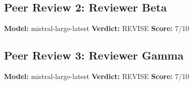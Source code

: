 \documentclass{article}
\begin{document}
\begin{quote}

\end{quote}

\subsection{Peer Review 2: Reviewer Beta}
\textbf{Model:} mistral-large-latest \quad \textbf{Verdict:} REVISE \quad \textbf{Score:} 7/10

\begin{quote}

\end{quote}

\subsection{Peer Review 3: Reviewer Gamma}
\textbf{Model:} mistral-large-latest \quad \textbf{Verdict:} REVISE \quad \textbf{Score:} 7/10

\begin{quote}

\end{quote}
\end{document}
